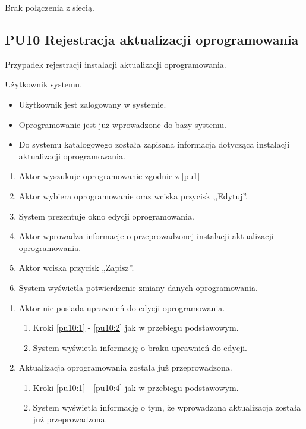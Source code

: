 Brak połączenia z siecią.

\subsection{PU10 Rejestracja aktualizacji oprogramowania} \label{pu10}
Przypadek rejestracji instalacji aktualizacji oprogramowania.

Użytkownik systemu.

\begin{itemize}
\item Użytkownik jest zalogowany w systemie.
\item Oprogramowanie jest już wprowadzone do bazy systemu.
\end{itemize}

\begin{itemize}
\item Do systemu katalogowego została zapisana informacja dotycząca instalacji aktualizacji oprogramowania.
\end{itemize}

\begin{enumerate}
	\item \label{pu10:1} Aktor wyszukuje oprogramowanie zgodnie z \ref{pu1}
	\item \label{pu10:2} Aktor wybiera oprogramowanie oraz wciska przycisk ,,Edytuj''.
	\item System prezentuje okno edycji oprogramowania.
	\item \label{pu10:4} Aktor wprowadza informacje o przeprowadzonej instalacji aktualizacji oprogramowania.
	\item Aktor wciska przycisk „Zapisz”.
	\item System wyświetla potwierdzenie zmiany danych oprogramowania.
\end{enumerate}

\begin{enumerate}
	\item Aktor nie posiada uprawnień do edycji oprogramowania.
	\begin{enumerate}[label*=\arabic*.]
		\item Kroki \ref{pu10:1} - \ref{pu10:2} jak w przebiegu podstawowym.
		\item System wyświetla informację o braku uprawnień do edycji.
	\end{enumerate}
	\item Aktualizacja oprogramowania została już przeprowadzona.
	\begin{enumerate}[label*=\arabic*.]
		\item Kroki \ref{pu10:1} - \ref{pu10:4} jak w przebiegu podstawowym.
		\item System wyświetla informację o tym, że wprowadzana aktualizacja została już przeprowadzona.
	\end{enumerate}
\end{enumerate}

